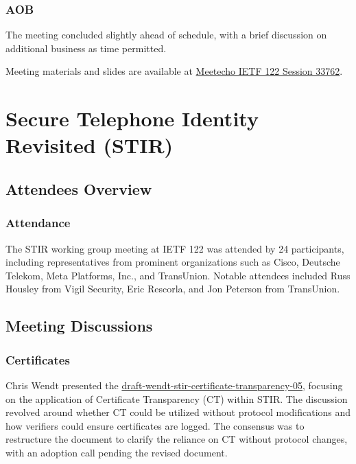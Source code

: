 \documentclass{article}
\begin{document}
\subsubsection{AOB}
The meeting concluded slightly ahead of schedule, with a brief discussion on additional business as time permitted.

Meeting materials and slides are available at \href{https://meetings.conf.meetecho.com/ietf122/?session=33762}{Meetecho IETF 122 Session 33762}.




\newpage

\section{Secure Telephone Identity Revisited (STIR)}

\subsection{Attendees Overview}
\subsubsection{Attendance}
The STIR working group meeting at IETF 122 was attended by 24 participants, including representatives from prominent organizations such as Cisco, Deutsche Telekom, Meta Platforms, Inc., and TransUnion. Notable attendees included Russ Housley from Vigil Security, Eric Rescorla, and Jon Peterson from TransUnion.

\subsection{Meeting Discussions}

\subsubsection{Certificates}
Chris Wendt presented the \href{https://datatracker.ietf.org/doc/html/draft-wendt-stir-certificate-transparency-05}{draft-wendt-stir-certificate-transparency-05}, focusing on the application of Certificate Transparency (CT) within STIR. The discussion revolved around whether CT could be utilized without protocol modifications and how verifiers could ensure certificates are logged. The consensus was to restructure the document to clarify the reliance on CT without protocol changes, with an adoption call pending the revised document.
\end{document}
